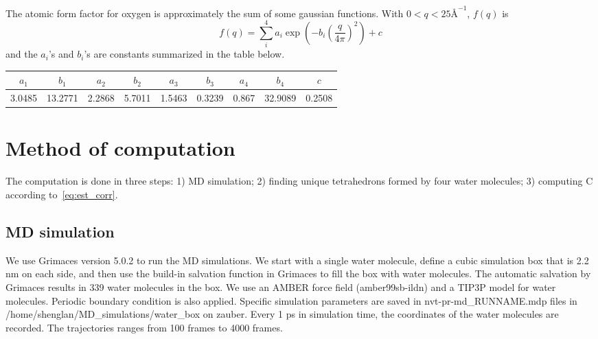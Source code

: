 \documentclass[20pt]{article}
\begin{document}
The atomic form factor for oxygen is approximately the sum of some gaussian functions. With $0 < q < 25 \si{\angstrom} ^{-1}$, $f(q)$ is
\begin{equation} \label{eq:Oform}
f(q) = \sum_{i}^{4} a_i \exp{(-b_i (\frac{q}{4\pi})^2)} + c
\end{equation}
and the $a_i$'s and $b_i$'s are constants summarized in the table below.
\begin{center}
\begin{tabular}{ |c|c|c|c|c|c|c|c|c|} 
 \hline
 $a_1$ & $b_1$ & $a_2$ & $b_2$ &$a_3$ & $b_3$ &$a_4$ & $b_4$ & $c$ \\ 
 \hline
3.0485 & 13.2771 & 2.2868 & 5.7011 & 1.5463 & 0.3239 & 0.867 & 32.9089 & 0.2508 \\ 
 \hline
\end{tabular}
\end{center}

\section{Method of computation}
The computation is done in three steps: 1) MD simulation; 2) finding unique tetrahedrons formed by four water molecules; 3) computing C according to~\ref{eq:est_corr}.

\subsection{MD simulation}
We use Grimaces version 5.0.2 to run the MD simulations. We start with a single water molecule, define a cubic simulation box that is 2.2 nm on each side, and then use the build-in salvation function in Grimaces to fill the box with water molecules. The automatic salvation by Grimaces results in 339 water molecules in the box. We use an AMBER force field (amber99sb-ildn) and a TIP3P model for water molecules. Periodic boundary condition is also applied. Specific simulation parameters are saved in nvt-pr-md\_RUNNAME.mdp files in /home/shenglan/MD\_simulations/water\_box on zauber. Every 1 ps in simulation time, the coordinates of the water molecules are recorded. The trajectories ranges from 100 frames to 4000 frames.
\end{document}
